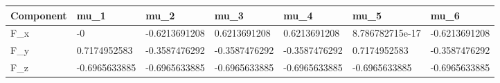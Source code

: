 \begin{tabular}{@{}lllllll@{}}
\toprule
Component & mu\_1 & mu\_2 & mu\_3 & mu\_4 & mu\_5 & mu\_6 \\
\midrule
F\_x & -0 & -0.6213691208 & 0.6213691208 & 0.6213691208 & 8.786782715e-17 & -0.6213691208 \\
F\_y & 0.7174952583 & -0.3587476292 & -0.3587476292 & -0.3587476292 & 0.7174952583 & -0.3587476292 \\
F\_z & -0.6965633885 & -0.6965633885 & -0.6965633885 & -0.6965633885 & -0.6965633885 & -0.6965633885 \\
\bottomrule
\end{tabular}

